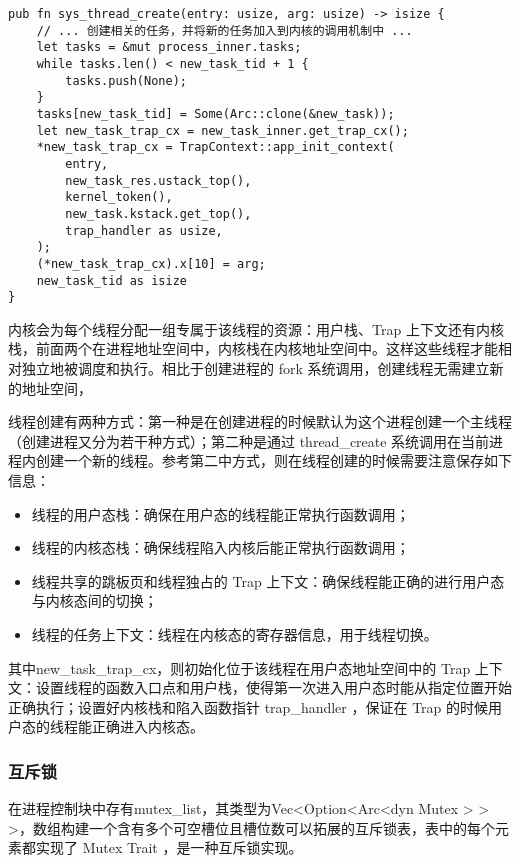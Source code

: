 \begin{lstlisting}[caption=sys\_thread\_create的系统调用]
pub fn sys_thread_create(entry: usize, arg: usize) -> isize {
    // ... 创建相关的任务，并将新的任务加入到内核的调用机制中 ...
    let tasks = &mut process_inner.tasks;
    while tasks.len() < new_task_tid + 1 {
        tasks.push(None);
    }
    tasks[new_task_tid] = Some(Arc::clone(&new_task));
    let new_task_trap_cx = new_task_inner.get_trap_cx();
    *new_task_trap_cx = TrapContext::app_init_context(
        entry,
        new_task_res.ustack_top(),
        kernel_token(),
        new_task.kstack.get_top(),
        trap_handler as usize,
    );
    (*new_task_trap_cx).x[10] = arg;
    new_task_tid as isize
}
\end{lstlisting}

内核会为每个线程分配一组专属于该线程的资源：用户栈、Trap 上下文还有内核栈，前面两个在进程地址空间中，内核栈在内核地址空间中。这样这些线程才能相对独立地被调度和执行。相比于创建进程的 fork 系统调用，创建线程无需建立新的地址空间，

线程创建有两种方式：第一种是在创建进程的时候默认为这个进程创建一个主线程（创建进程又分为若干种方式）；第二种是通过 thread\_create 系统调用在当前进程内创建一个新的线程。参考第二中方式，则在线程创建的时候需要注意保存如下信息： 

\begin{itemize}
\item 线程的用户态栈：确保在用户态的线程能正常执行函数调用；
\item 线程的内核态栈：确保线程陷入内核后能正常执行函数调用；
\item 线程共享的跳板页和线程独占的 Trap 上下文：确保线程能正确的进行用户态与内核态间的切换；
\item 线程的任务上下文：线程在内核态的寄存器信息，用于线程切换。
\end{itemize}

其中new\_task\_trap\_cx，则初始化位于该线程在用户态地址空间中的 Trap 上下文：设置线程的函数入口点和用户栈，使得第一次进入用户态时能从指定位置开始正确执行；设置好内核栈和陷入函数指针 trap\_handler ，保证在 Trap 的时候用户态的线程能正确进入内核态。


\subsubsection{互斥锁}


在进程控制块中存有mutex\_list，其类型为Vec<Option<Arc<dyn Mutex > > >，数组构建一个含有多个可空槽位且槽位数可以拓展的互斥锁表，表中的每个元素都实现了 Mutex Trait ，是一种互斥锁实现。

